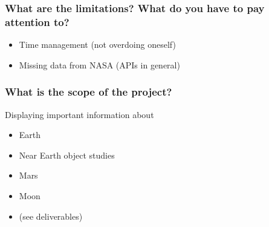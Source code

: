 \documentclass{article}
\begin{document}
\subsubsection*{What are the limitations? What do you have to pay attention to?}
\begin{itemize}
    \item Time management (not overdoing oneself)
    \item Missing data from NASA (APIs in general)
\end{itemize}

\subsubsection*{What is the scope of the project?}
Displaying important information about
\begin{itemize}
    \item Earth
    \item Near Earth object studies
    \item Mars
    \item Moon
    \item (see deliverables)
\end{itemize}
\end{document}
